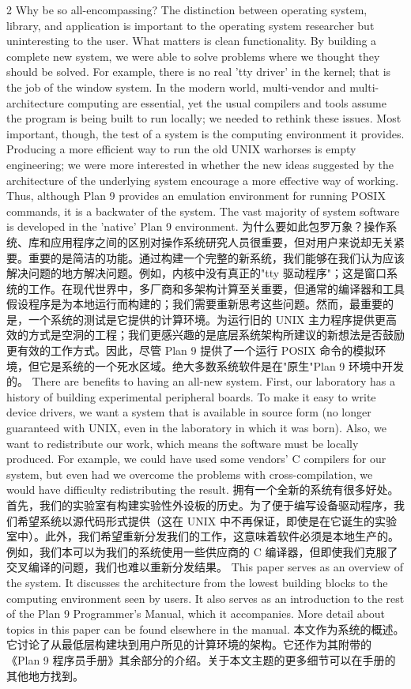 \documentclass{article}
\begin{document}
\begin{paracol}{2}
\switchcolumn*
Why be so all-encompassing? The distinction between operating system, library, and application is important to the operating system researcher but uninteresting to the user. What matters is clean functionality. By building a complete new system, we were able to solve problems where we thought they should be solved. For example, there is no real 'tty driver' in the kernel; that is the job of the window system. In the modern world, multi-vendor and multi-architecture computing are essential, yet the usual compilers and tools assume the program is being built to run locally; we needed to rethink these issues. Most important, though, the test of a system is the computing environment it provides. Producing a more efficient way to run the old UNIX warhorses is empty engineering; we were more interested in whether the new ideas suggested by the architecture of the underlying system encourage a more effective way of working. Thus, although Plan 9 provides an emulation environment for running POSIX commands, it is a backwater of the system. The vast majority of system software is developed in the 'native' Plan 9 environment.
\switchcolumn
为什么要如此包罗万象？操作系统、库和应用程序之间的区别对操作系统研究人员很重要，但对用户来说却无关紧要。重要的是简洁的功能。通过构建一个完整的新系统，我们能够在我们认为应该解决问题的地方解决问题。例如，内核中没有真正的"tty 驱动程序"；这是窗口系统的工作。在现代世界中，多厂商和多架构计算至关重要，但通常的编译器和工具假设程序是为本地运行而构建的；我们需要重新思考这些问题。然而，最重要的是，一个系统的测试是它提供的计算环境。为运行旧的 UNIX 主力程序提供更高效的方式是空洞的工程；我们更感兴趣的是底层系统架构所建议的新想法是否鼓励更有效的工作方式。因此，尽管 Plan 9 提供了一个运行 POSIX 命令的模拟环境，但它是系统的一个死水区域。绝大多数系统软件是在"原生"Plan 9 环境中开发的。
\switchcolumn*
There are benefits to having an all-new system. First, our laboratory has a history of building experimental peripheral boards. To make it easy to write device drivers, we want a system that is available in source form (no longer guaranteed with UNIX, even in the laboratory in which it was born). Also, we want to redistribute our work, which means the software must be locally produced. For example, we could have used some vendors' C compilers for our system, but even had we overcome the problems with cross-compilation, we would have difficulty redistributing the result.
\switchcolumn
拥有一个全新的系统有很多好处。首先，我们的实验室有构建实验性外设板的历史。为了便于编写设备驱动程序，我们希望系统以源代码形式提供（这在 UNIX 中不再保证，即使是在它诞生的实验室中）。此外，我们希望重新分发我们的工作，这意味着软件必须是本地生产的。例如，我们本可以为我们的系统使用一些供应商的 C 编译器，但即使我们克服了交叉编译的问题，我们也难以重新分发结果。
\switchcolumn*
This paper serves as an overview of the system. It discusses the architecture from the lowest building blocks to the computing environment seen by users. It also serves as an introduction to the rest of the Plan 9 Programmer's Manual, which it accompanies. More detail about topics in this paper can be found elsewhere in the manual.
\switchcolumn
本文作为系统的概述。它讨论了从最低层构建块到用户所见的计算环境的架构。它还作为其附带的《Plan 9 程序员手册》其余部分的介绍。关于本文主题的更多细节可以在手册的其他地方找到。
\switchcolumn*

\end{paracol}
\end{document}
